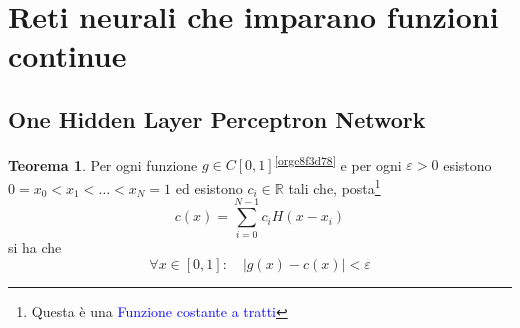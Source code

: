\documentclass[10pt]{book}
\newcommand{\1}{\mathds{1}}
\newcommand{\R}{\mathds{R}}
\theoremstyle{definition}%
\newtheorem{thm}{Teorema}[section]
\theoremstyle{plain}
\theoremstyle{remark}
\renewcommand{\href}[2]{\textcolor{blue}{#2}}
\begin{document}
\section{Reti neurali che imparano funzioni continue}
\label{sec:org7553a6d}

\subsection{One Hidden Layer Perceptron Network}
\label{sec:orgafa4408}

\begin{thm}
Per ogni funzione \(g \in C[0,1]\)\textsuperscript{\ref{orgc8f3d78}} e per ogni \(\varepsilon>0\) esistono \(0=x_{0}<x_{1}<\dots<x_{N} = 1\) ed esistono \(c_{i} \in \R\) tali che, posta\footnote{Questa è una \href{../../../../../org/roam/20250701140621-funzione_costante_a_tratti.org}{Funzione costante a tratti}}
\begin{equation*}
c(x) = \sum_{i=0}^{N-1} c_{i} H(x-x_{i})
\end{equation*}
si ha che
\begin{equation*}
\forall x \in [0,1]:\quad |g(x)-c(x)|<\varepsilon
\end{equation*}
\end{thm}
\end{document}
